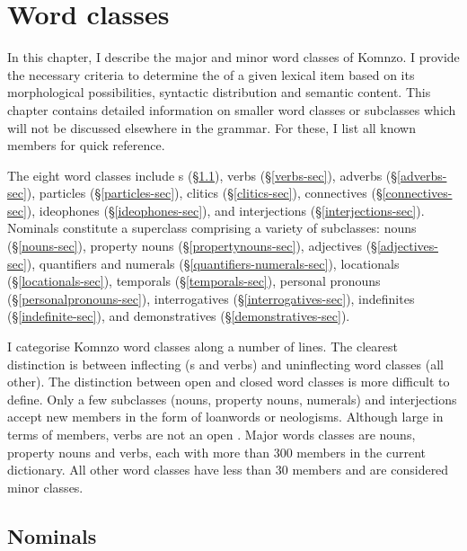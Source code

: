 \chapter{Word classes} \label{cha:word classes}

In this chapter, I describe the major and minor word classes of Komnzo. I provide the necessary criteria to determine the  of a given lexical item based on its morphological possibilities, syntactic distribution and semantic content. This chapter contains detailed information on smaller word classes or subclasses which will not be discussed elsewhere in the grammar. For these, I list all known members for quick reference.

The eight word classes include s ({\S}\ref{nominals-sec}), verbs ({\S}\ref{verbs-sec}), adverbs ({\S}\ref{adverbs-sec}), particles ({\S}\ref{particles-sec}), clitics ({\S}\ref{clitics-sec}), connectives ({\S}\ref{connectives-sec}), ideophones (\S\ref{ideophones-sec}), and interjections ({\S}\ref{interjections-sec}). Nominals constitute a superclass comprising a variety of subclasses: nouns ({\S}\ref{nouns-sec}), property nouns ({\S}\ref{propertynouns-sec}), adjectives ({\S}\ref{adjectives-sec}), quantifiers and numerals ({\S}\ref{quantifiers-numerals-sec}), locationals ({\S}\ref{locationals-sec}), temporals ({\S}\ref{temporals-sec}), personal pronouns ({\S}\ref{personalpronouns-sec}), interrogatives ({\S}\ref{interrogatives-sec}), indefinites ({\S}\ref{indefinite-sec}), and demonstratives ({\S}\ref{demonstratives-sec}).

I categorise Komnzo word classes along a number of lines. The clearest distinction is between inflecting (s and verbs) and uninflecting word classes (all other). The distinction between open and closed word classes is more difficult to define. Only a few  subclasses (nouns, property nouns, numerals) and interjections accept new members in the form of loanwords or neologisms. Although large in terms of members, verbs are not an open . Major words classes are nouns, property nouns and verbs, each with more than 300 members in the current dictionary. All other word classes have less than 30 members and are considered minor classes.

\section{Nominals} \label{nominals-sec}

